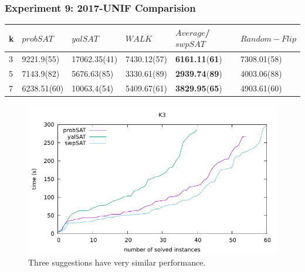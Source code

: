 \documentclass[12pt,a4paper,twoside]{scrartcl}
\numberwithin{equation}{section}
\begin{document}
\subsubsection{Experiment 9: 2017-UNIF Comparision} 
\label{sec:Experiment 9}
   \begin{table}[H]
\begin{center}
    \begin{tabular}{|l|l|l|l|l|p{3cm}|}
\hline 

    k &$probSAT$&$yalSAT$&$WALK$&$Average$/$swpSAT$&$Random-Flip$ \\ \hline      
    3 &9221.9(55)&17062.35(41)&7430.12(57)&\textbf{6161.11}(\textbf{61})&7308.01(58)\\ \hline
    5& 7143.9(82)&5676.63(85)&3330.61(89)&\textbf{2939.74}(\textbf{89})&4003.06(88)\\ \hline
    7& 6238.51(60)&10063.4(54)&5409.67(61)&\textbf{3829.95}(\textbf{65})&4903.61(60)\\ \hline
	
\end{tabular}
\end{center}
\end{table}
  \begin{figure}[H]
\begin{center}
  \includegraphics[scale = 1]{DATA/K3/e5.pdf}
  \end{center}
  \caption{Three suggestions have very similar performance.}
  \label{Experiment 9 k3 cactus plot}
  \end{figure}
\end{document}
